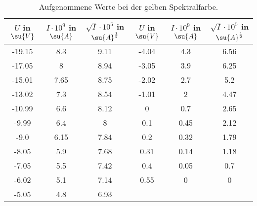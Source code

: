 \begin{table}
  \centering
  \label{tab:GelbKomplett}
  \caption{Aufgenommene Werte bei der gelben Spektralfarbe.}
  \begin{tabular}{c c c | c c c }
    \toprule
    $U$ in $\su{V}$ & $I\cdot 10^{9}$ in $\su{A}$ & $\sqrt{I}\cdot10^{5}$ in $\su{A}^{\frac{1}{2}}$ &
    $U$ in $\su{V}$ & $I\cdot 10^{9}$ in $\su{A}$ & $\sqrt{I}\cdot10^{5}$ in $\su{A}^{\frac{1}{2}}$ \\
    \midrule
    -19.15 & 8.3  & 9.11 & -4.04  & 4.3  & 6.56 \\
    -17.05 & 8    & 8.94 & -3.05  & 3.9  & 6.25 \\
    -15.01 & 7.65 & 8.75 & -2.02  & 2.7  & 5.2  \\
    -13.02 & 7.3  & 8.54 & -1.01  & 2    & 4.47 \\
    -10.99 & 6.6  & 8.12 &  0     & 0.7  & 2.65 \\
    -9.99  & 6.4  & 8    &  0.1   & 0.45 & 2.12 \\
    -9.0   & 6.15 & 7.84 &  0.2   & 0.32 & 1.79 \\
    -8.05  & 5.9  & 7.68 &  0.31  & 0.14 & 1.18 \\
    -7.05  & 5.5  & 7.42 &  0.4   & 0.05 & 0.7  \\
    -6.02  & 5.1  & 7.14 &  0.55  & 0    & 0    \\
    -5.05  & 4.8  & 6.93 &        &      &      \\
     \bottomrule
   \end{tabular}
 \end{table}
